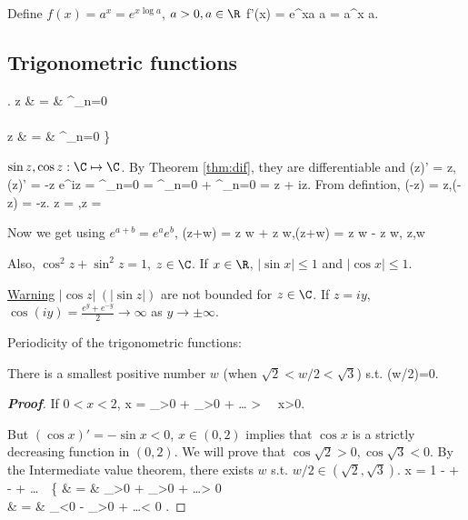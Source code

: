Define $f(x) = a^x = e^{x\log a}$, $a>0, a\in\R$
\be
f'(x) = e^{x\log a} \log a = a^x \log a.
\ee

\subsection{Trigonometric functions}

\be
\left.
\sin z & = & \sum^\infty_{n=0}\\
\\
\cos z & = & \sum^\infty_{n=0}
\ea\right\}
\ee

$\sin z, \cos z: \C\mapsto \C$. By Theorem \ref{thm:dif}, they are differentiable and 
\be
(\sin z)' = \cos z,\quad (\cos z)' = -\sin z
\ee
\be
e^{iz} = \sum^\infty_{n=0} = \sum^\infty_{n=0} + \sum^\infty_{n=0} = \cos z + i\sin z.
\ee
From defintion,
\be
\cos (-z) = \cos z,\quad \sin(- z) = -\sin z.
\ee
\be
\cos z = ,\quad \sin z = 
\ee

Now we get using $e^{a+b} = e^a e^b$,
\be
\sin (z+w) = \sin z \cos w + \cos z \sin w,\quad \cos (z+w) = \cos z \cos w - \sin z \sin w, \quad z,w \in\C
\ee

Also, $\cos^2 z + \sin^2 z = 1$, $z\in\C$. If $x\in\R$, $|\sin x|\leq 1$ and $|\cos x|\leq 1$.

\underline{Warning} $|\cos z|\ (|\sin z|)$ are not bounded for $z\in \C$. If $z=iy$, $\cos(iy)=\frac{e^y+e^{-y}}{2}\to \infty$ as $y\to \pm\infty$.

Periodicity of the trigonometric functions:

\begin{proposition}
There is a smallest positive number $w$ (when $\sqrt{2} < w/2 <\sqrt{3}$) s.t. 
\be
\cos(w/2)=0.
\ee
\end{proposition}

\begin{proof}[{\bf Proof}]
If $0<x<2$,
\be
\sin x = _{>0} + _{>0} + \dots \quad \lob {} >   \rob \ \ra \  \sin x>0.
\ee

But $(\cos x)'=-\sin x<0$, $x\in(0,2)$ implies that $\cos x$ is a strictly decreasing function in $(0,2)$. We will prove that $\cos \sqrt{2}>0, \cos\sqrt{3}<0$. By the Intermediate value theorem, there exists $w$ s.t. $w/2\in (\sqrt{2},\sqrt{3})$.
\beast
\cos x = 1 -  +  -  + \dots \ \ra \ 
\left\{
\cos {} & = &  _{>0} + _{>0} + \dots  > 0 \\
\cos \sqrt{3} & = & \underbrace{\lob 1 - \frac {\sqrt{3}^2}{2!} + \frac {\sqrt{3}^4}{4!} \rob}_{<0} - _{>0} + \dots < 0 
\ea\right.
\eeast
\end{proof}

